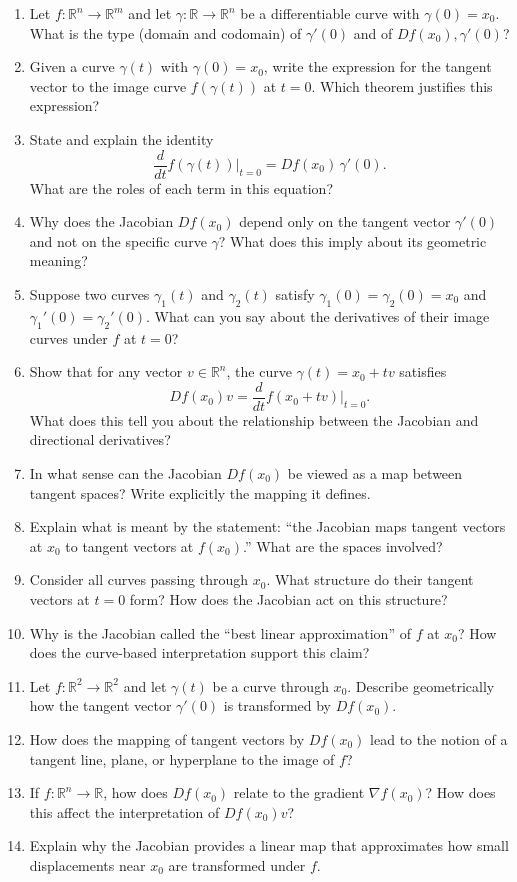 \begin{enumerate}[resume]
  \item Let $f : \mathbb{R}^n \to \mathbb{R}^m$ and let $\gamma : \mathbb{R} \to \mathbb{R}^n$ be a differentiable curve with $\gamma(0) = x_0$. What is the type (domain and codomain) of $\gamma'(0)$ and of $Df(x_0),\gamma'(0)$?
  \item Given a curve $\gamma(t)$ with $\gamma(0) = x_0$, write the expression for the tangent vector to the image curve $f(\gamma(t))$ at $t=0$. Which theorem justifies this expression?
  \item State and explain the identity
    \[
      \frac{d}{dt} f(\gamma(t)) \bigg|_{t=0} = Df(x_0)\,\gamma'(0).
    \]
    What are the roles of each term in this equation?
  \item Why does the Jacobian $Df(x_0)$ depend only on the tangent vector $\gamma'(0)$ and not on the specific curve $\gamma$? What does this imply about its geometric meaning?
  \item Suppose two curves $\gamma_1(t)$ and $\gamma_2(t)$ satisfy $\gamma_1(0)=\gamma_2(0)=x_0$ and $\gamma_1'(0)=\gamma_2'(0)$. What can you say about the derivatives of their image curves under $f$ at $t=0$?
  \item Show that for any vector $v \in \mathbb{R}^n$, the curve $\gamma(t) = x_0 + t v$ satisfies
    \[
      Df(x_0)v = \frac{d}{dt} f(x_0 + t v)\bigg|_{t=0}.
    \]
    What does this tell you about the relationship between the Jacobian and directional derivatives?
  \item In what sense can the Jacobian $Df(x_0)$ be viewed as a map between tangent spaces? Write explicitly the mapping it defines.
  \item Explain what is meant by the statement: ``the Jacobian maps tangent vectors at $x_0$ to tangent vectors at $f(x_0)$.'' What are the spaces involved?
  \item Consider all curves passing through $x_0$. What structure do their tangent vectors at $t=0$ form? How does the Jacobian act on this structure?
  \item Why is the Jacobian called the ``best linear approximation'' of $f$ at $x_0$? How does the curve-based interpretation support this claim?
  \item Let $f : \mathbb{R}^2 \to \mathbb{R}^2$ and let $\gamma(t)$ be a curve through $x_0$. Describe geometrically how the tangent vector $\gamma'(0)$ is transformed by $Df(x_0)$.
  \item How does the mapping of tangent vectors by $Df(x_0)$ lead to the notion of a tangent line, plane, or hyperplane to the image of $f$?
  \item If $f : \mathbb{R}^n \to \mathbb{R}$, how does $Df(x_0)$ relate to the gradient $\nabla f(x_0)$? How does this affect the interpretation of $Df(x_0)v$?
  \item Explain why the Jacobian provides a linear map that approximates how small displacements near $x_0$ are transformed under $f$.
\end{enumerate}

